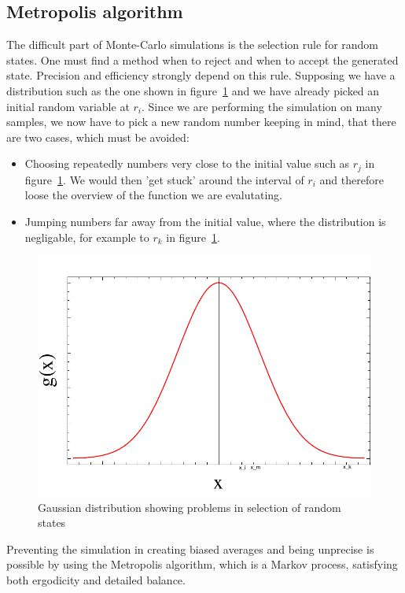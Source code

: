 \subsection{Metropolis algorithm}
The difficult part of Monte-Carlo simulations is the selection rule for random states. One must find a method when to reject and when to accept the generated state. Precision and efficiency strongly depend on this rule. Supposing we have a distribution such as the one shown in figure~\ref{fig:distribution} and we have already picked an initial random variable at $r_i$. Since we are performing the simulation on many samples, we now have to pick a new random number keeping in mind, that there are two cases, which must be avoided:
\begin{itemize}
\item Choosing repeatedly numbers very close to the initial value such as $r_j$ in figure~\ref{fig:distribution}. We would then 'get stuck' around the interval of $r_i$ and therefore loose the overview of the function we are evalutating.
\item Jumping numbers far away from the initial value, where the distribution is negligable, for example to $r_k$ in figure~\ref{fig:distribution}. 
\end{itemize}
\begin{figure}[htbp]
    \centering
    \includegraphics[scale=0.6]{distribution}
    \caption{Gaussian distribution showing problems in selection of random states}
    \label{fig:distribution}
\end{figure}
Preventing the simulation in creating biased averages and being unprecise is possible by using the Metropolis algorithm, which is a Markov process, satisfying both ergodicity and detailed balance.\\
